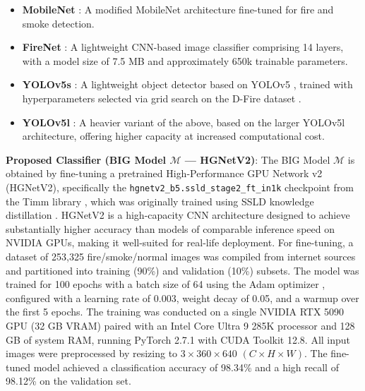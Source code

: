 \documentclass[
  10pt,
]{article}
\begin{document}
\begin{itemize}
\item
  \textbf{MobileNet} : A
  modified MobileNet architecture fine-tuned for fire and smoke
  detection.
\item
  \textbf{FireNet} : A
  lightweight CNN-based image classifier comprising 14 layers, with a
  model size of 7.5 MB and approximately 650k trainable parameters.
\item
  \textbf{YOLOv5s} : A lightweight
  object detector based on YOLOv5
  , trained with
  hyperparameters selected via grid search on the D-Fire dataset
  .
\item
  \textbf{YOLOv5l} : A heavier
  variant of the above, based on the larger YOLOv5l architecture,
  offering higher capacity at increased computational cost.
\end{itemize}

\textbf{Proposed Classifier (BIG Model \(\mathcal{M}\) --- HGNetV2)}:
The BIG Model \(\mathcal{M}\) is obtained by fine-tuning a pretrained
High-Performance GPU Network v2 (HGNetV2), specifically the
\texttt{hgnetv2\_b5.ssld\_stage2\_ft\_in1k} checkpoint
 from the Timm library
, which was originally trained using
SSLD knowledge distillation .
HGNetV2  is a
high-capacity CNN architecture designed to achieve substantially higher
accuracy than models of comparable inference speed on NVIDIA GPUs,
making it well-suited for real-life deployment. For fine-tuning, a
dataset of 253,325 fire/smoke/normal images was compiled from internet
sources and partitioned into training (90\%) and validation (10\%)
subsets. The model was trained for 100 epochs with a batch size of 64
using the Adam optimizer ,
configured with a learning rate of 0.003, weight decay of 0.05, and a
warmup over the first 5 epochs. The training was conducted on a single
NVIDIA RTX 5090 GPU (32 GB VRAM) paired with an Intel Core Ultra 9 285K
processor and 128 GB of system RAM, running PyTorch 2.7.1 with CUDA
Toolkit 12.8. All input images were preprocessed by resizing to
\(3 \times 360 \times 640\) \((C \times H \times W)\). The fine-tuned
model achieved a classification accuracy of 98.34\% and a high recall of
98.12\% on the validation set.
\end{document}
